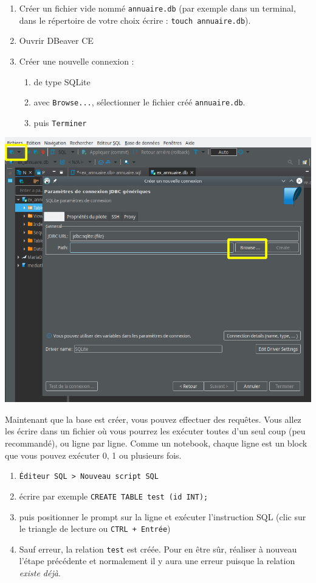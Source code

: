 \documentclass[a4paper,17pt]{extarticle}
\providecommand{\tightlist}{%
      \setlength{\itemsep}{0pt}\setlength{\parskip}{0pt}}
\begin{document}
\begin{enumerate}
\def\labelenumi{\arabic{enumi}.}
\tightlist
\item
  Créer un fichier vide nommé \texttt{annuaire.db} (par exemple dans un
  terminal, dans le répertoire de votre choix écrire :
  \texttt{touch\ annuaire.db}).
\item
  Ouvrir DBeaver CE
\item
  Créer une nouvelle connexion :

  \begin{enumerate}
  \def\labelenumii{\arabic{enumii}.}
  \tightlist
  \item
    de type SQLite
  \item
    avec \texttt{Browse...}, sélectionner le fichier créé
    \texttt{annuaire.db}.
  \item
    puis \texttt{Terminer}
  \end{enumerate}
\end{enumerate}

    \includegraphics{./img-dbeaver-connexion.png}

    Maintenant que la base est créer, vous pouvez effectuer des requêtes.
Vous allez les écrire dans un fichier où vous pourrez les exécuter
toutes d'un seul coup (peu recommandé), ou ligne par ligne. Comme un
notebook, chaque ligne est un block que vous pouvez exécuter 0, 1 ou
plusieurs fois.

\begin{enumerate}
\def\labelenumi{\arabic{enumi}.}
\tightlist
\item
  \texttt{Éditeur\ SQL\ \textgreater{}\ Nouveau\ script\ SQL}
\item
  écrire par exemple \texttt{CREATE\ TABLE\ test\ (id\ INT);}
\item
  puis positionner le prompt sur la ligne et exécuter l'instruction SQL
  (clic sur le triangle de lecture ou \texttt{CTRL\ +\ Entrée})
\item
  Sauf erreur, la relation \texttt{test} est créée. Pour en être sûr,
  réaliser à nouveau l'étape précédente et normalement il y aura une
  erreur puisque la relation \emph{existe déjà}.
\end{enumerate}
\end{document}

